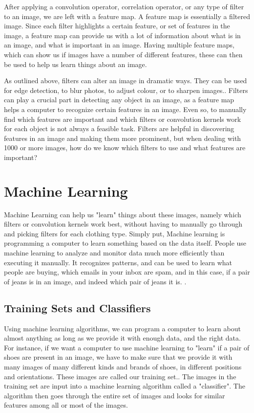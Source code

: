 \documentclass[12pt]{report} %
\begin{document}
	 After applying a convolution operator, correlation operator, or any type of filter to an image, we are left with a feature map. A feature map is essentially a filtered image. Since each filter highlights a certain feature, or set of features in the image, a feature map can provide us with a lot of information about what is in an image, and what is important in an image\cite{aurelienMachineLearning}. Having multiple feature maps, which can show us if images have a number of different features, these can then be used to help us learn things about an image.
	
	As outlined above, filters can alter an image in dramatic ways. They can be used for edge detection, to blur photos, to adjust colour, or to sharpen images.\cite{szeliski2010computer}. Filters can play a crucial part in detecting any object in an image, as a feature map helps a computer to recognize certain features in an image. Even so, to manually find which features are important and which filters or convolution kernels work for each object is not always a feasible task. Filters are helpful in discovering features in an image and making them more prominent, but when dealing with 1000 or more images, how do we know which filters to use and what features are important? 
\chapter{Machine Learning}
	Machine Learning can help us "learn" things about these images, namely which filters or convolution kernels work best, without having to manually go through and picking filters for each clothing type. 
	Simply put, Machine learning is programming a computer to learn something based on the data itself. People use machine learning to analyze and monitor data much more efficiently than executing it manually. It recognizes patterns, and can be used to learn what people are buying, which emails in your inbox are spam, and in this case, if a pair of jeans is in an image, and indeed which pair of jeans it is. \cite{aurelienMachineLearning}. 

\section{Training Sets and Classifiers}
	Using machine learning algorithms, we can program a computer to learn about almost anything as long as we provide it with enough data, and the right data. For instance, if we want a computer to use machine learning to "learn" if a pair of shoes are present in an image, we have to make sure that we provide it with many images of many different kinds and brands of shoes, in different positions and orientations. These images are called our training set.\cite{aurelienMachineLearning}. The images in the training set are input into a machine learning algorithm called a "classifier"\cite{KubatMachineLearn}. The algorithm then goes through the entire set of images and looks for similar features among all or most of the images. 
	
\end{document}
